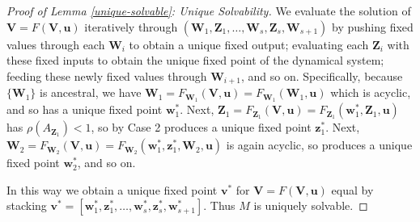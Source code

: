 \documentclass[letterpaper,10pt]{article}
\newtheorem{theorem}{Theorem}
\begin{document}
\begin{proof}[Proof of Lemma \ref{unique-solvable}: Unique Solvability]
We evaluate the solution of $\mathbf{V}=F(\mathbf{V},\mathbf{u})$ iteratively through $(\mathbf{W}_1,\mathbf{Z}_1,\hdots,\mathbf{W}_s,\mathbf{Z}_s,\mathbf{W}_{s+1})$ by pushing fixed values through each $\mathbf{W}_i$ to obtain a unique fixed output; evaluating each $\mathbf{Z}_i$ with these fixed inputs to obtain the unique fixed point of the dynamical system; feeding these newly fixed values through $\mathbf{W}_{i+1}$, and so on.
Specifically, because $\{\mathbf{W}_1\}$ is ancestral, we have $\mathbf{W}_1=F_{\mathbf{W}_1}(\mathbf{V},\mathbf{u})=F_{\mathbf{W}_1}(\mathbf{W}_1,\mathbf{u})$ which is acyclic, and so has a unique fixed point $\mathbf{w}_1^*$. Next, $\mathbf{Z}_1=F_{\mathbf{Z}_1}(\mathbf{V},\mathbf{u})=F_{\mathbf{Z}_1}(\mathbf{w}_1^*,\mathbf{Z}_1,\mathbf{u})$ has $\rho(A_{\mathbf{Z}_1})<1$, so by Case 2 produces a unique fixed point $\mathbf{z}_1^*$.
Next, $\mathbf{W}_2=F_{\mathbf{W}_2}(\mathbf{V},\mathbf{u})=F_{\mathbf{W}_2}(\mathbf{w}_1^*,\mathbf{z}_1^*,\mathbf{W}_2,\mathbf{u})$ is again acyclic, so produces a unique fixed point $\mathbf{w}_2^*$, and so on.

In this way we obtain a unique fixed point $\mathbf{v}^*$ for $\mathbf{V}=F(\mathbf{V},\mathbf{u})$ equal by stacking $\mathbf{v}^*=[\mathbf{w}_1^*,\mathbf{z}_1^*,\hdots,\mathbf{w}_s^*,\mathbf{z}_s^*,\mathbf{w}_{s+1}^*]$.
Thus $M$ is uniquely solvable.
\end{proof}


\end{document}
